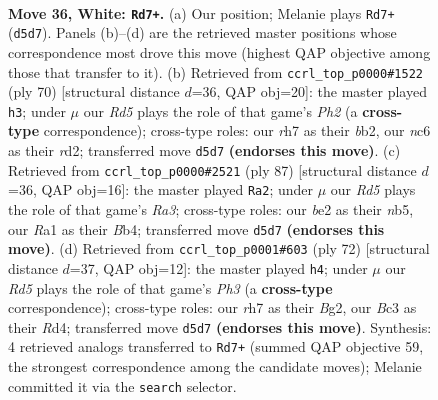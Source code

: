 \documentclass[11pt]{article}
\begin{document}
\clearpage

\begin{figure}[p]\centering
\begin{subfigure}{0.46\textwidth}\centering
\resizebox{\linewidth}{!}{%
\newchessgame
\chessboard[
  setfen={r7/5k1r/p1n5/3R4/1P3P2/2B3K1/P3b3/R7 w - - 5 36},
  showmover=false,
  pgfstyle=straightmove, color=movearrow, markmove={d5-d7}
]}
\caption{}
\end{subfigure}\hfill
\begin{subfigure}{0.46\textwidth}\centering
\resizebox{\linewidth}{!}{%
\newchessgame
\chessboard[
  setfen={7k/5R2/4B1pp/p7/P5P1/8/1b1r1P1P/6K1 w - - 1 36},
  showmover=false,
  pgfstyle=straightmove, color=movearrow, markmove={h2-h3}
]}
\caption{}
\end{subfigure}
\\[4pt]
\begin{subfigure}{0.46\textwidth}\centering
\resizebox{\linewidth}{!}{%
\newchessgame
\chessboard[
  setfen={6k1/6p1/r6p/1N6/1b2r2P/5RP1/8/3R1K2 b - - 2 44},
  showmover=false,
  pgfstyle=straightmove, color=movearrow, markmove={a6-a2}
]}
\caption{}
\end{subfigure}\hfill
\begin{subfigure}{0.46\textwidth}\centering
\resizebox{\linewidth}{!}{%
\newchessgame
\chessboard[
  setfen={4r2k/1r3b1p/6p1/8/3RP3/R6P/6B1/7K w - - 3 37},
  showmover=false,
  pgfstyle=straightmove, color=movearrow, markmove={h3-h4}
]}
\caption{}
\end{subfigure}
\caption{\textbf{Move 36, White: \texttt{Rd7+}.} (a) Our position; Melanie plays \texttt{Rd7+} (\texttt{d5d7}). Panels (b)--(d) are the retrieved master positions whose correspondence most drove this move (highest QAP objective among those that transfer to it). (b) Retrieved from \texttt{ccrl\_top\_p0000\#1522} (ply 70) [structural distance $d$=36, QAP obj=20]: the master played \texttt{h3}; under $\mu$ our \emph{Rd5} plays the role of that game's \emph{Ph2} (a \textbf{cross-type} correspondence); cross-type roles: our \emph{r}h7 as their \emph{b}b2, our \emph{n}c6 as their \emph{r}d2; transferred move \texttt{d5d7} \textbf{(endorses this move)}. (c) Retrieved from \texttt{ccrl\_top\_p0000\#2521} (ply 87) [structural distance $d$=36, QAP obj=16]: the master played \texttt{Ra2}; under $\mu$ our \emph{Rd5} plays the role of that game's \emph{Ra3}; cross-type roles: our \emph{b}e2 as their \emph{n}b5, our \emph{R}a1 as their \emph{B}b4; transferred move \texttt{d5d7} \textbf{(endorses this move)}. (d) Retrieved from \texttt{ccrl\_top\_p0001\#603} (ply 72) [structural distance $d$=37, QAP obj=12]: the master played \texttt{h4}; under $\mu$ our \emph{Rd5} plays the role of that game's \emph{Ph3} (a \textbf{cross-type} correspondence); cross-type roles: our \emph{r}h7 as their \emph{B}g2, our \emph{B}c3 as their \emph{R}d4; transferred move \texttt{d5d7} \textbf{(endorses this move)}. Synthesis: 4 retrieved analogs transferred to \texttt{Rd7+} (summed QAP objective 59, the strongest correspondence among the candidate moves); Melanie committed it via the \texttt{search} selector.}
\label{fig:thought-m70}
\end{figure}
\end{document}
